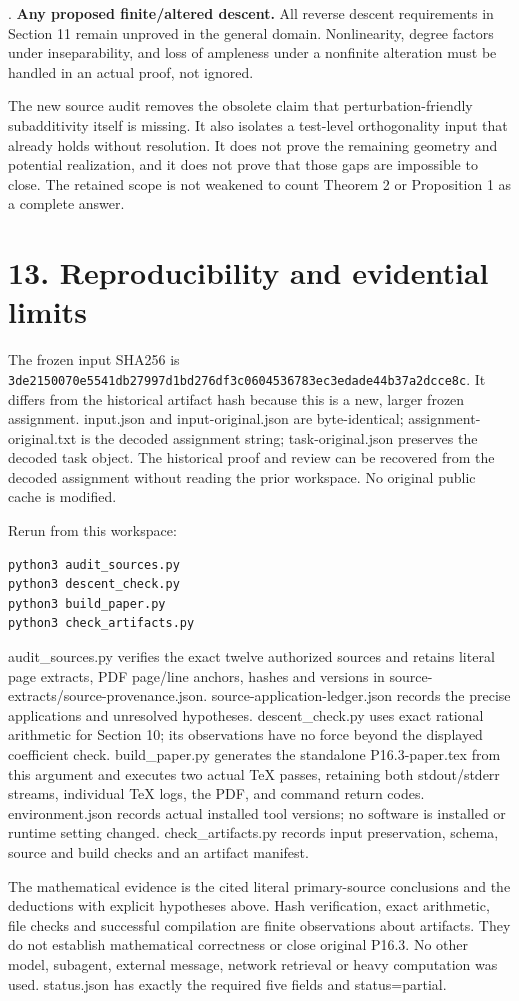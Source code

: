 \documentclass[11pt]{article}
\begin{document}
. \textbf{Any proposed finite/altered descent.} All reverse descent requirements in Section 11 remain unproved in the general domain. Nonlinearity, degree factors under inseparability, and loss of ampleness under a nonfinite alteration must be handled in an actual proof, not ignored.

The new source audit removes the obsolete claim that perturbation-friendly subadditivity itself is missing. It also isolates a test-level orthogonality input that already holds without resolution. It does not prove the remaining geometry and potential realization, and it does not prove that those gaps are impossible to close. The retained scope is not weakened to count Theorem 2 or Proposition 1 as a complete answer.

\section*{13. Reproducibility and evidential limits}

The frozen input SHA256 is \texttt{3de21500\allowbreak{}70e5541d\allowbreak{}b27997d1\allowbreak{}bd276df3\allowbreak{}c0604536\allowbreak{}783ec3ed\allowbreak{}ade44b37\allowbreak{}a2dcce8c}. It differs from the historical artifact hash because this is a new, larger frozen assignment. input.json and input-original.json are byte-identical; assignment-original.txt is the decoded assignment string; task-original.json preserves the decoded task object. The historical proof and review can be recovered from the decoded assignment without reading the prior workspace. No original public cache is modified.

Rerun from this workspace:

\begin{verbatim}
python3 audit_sources.py
python3 descent_check.py
python3 build_paper.py
python3 check_artifacts.py
\end{verbatim}

audit\_sources.py verifies the exact twelve authorized sources and retains literal page extracts, PDF page/line anchors, hashes and versions in source-extracts/source-provenance.json. source-application-ledger.json records the precise applications and unresolved hypotheses. descent\_check.py uses exact rational arithmetic for Section 10; its observations have no force beyond the displayed coefficient check. build\_paper.py generates the standalone P16.3-paper.tex from this argument and executes two actual TeX passes, retaining both stdout/stderr streams, individual TeX logs, the PDF, and command return codes. environment.json records actual installed tool versions; no software is installed or runtime setting changed. check\_artifacts.py records input preservation, schema, source and build checks and an artifact manifest.

The mathematical evidence is the cited literal primary-source conclusions and the deductions with explicit hypotheses above. Hash verification, exact arithmetic, file checks and successful compilation are finite observations about artifacts. They do not establish mathematical correctness or close original P16.3. No other model, subagent, external message, network retrieval or heavy computation was used. status.json has exactly the required five fields and status=partial.
\end{document}
